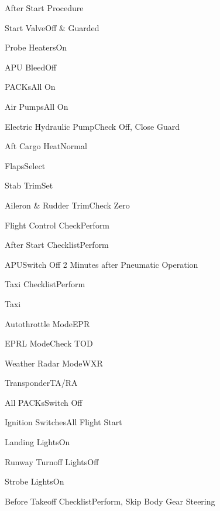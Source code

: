\documentclass[sim-use, blue_items]{checklist}
\begin{document}
\begin{checklist}{After Start Procedure}
	\item{Start Valve}{Off \& Guarded}
	\item{Probe Heaters}{On}
	\item{APU Bleed}{Off}
	\item{PACKs}{All On}
	\item{Air Pumps}{All On}
	\item{Electric Hydraulic Pump}{Check Off, Close Guard}
	\item{Aft Cargo Heat}{Normal}
	\item{Flaps}{Select}
	\item{Stab Trim}{Set}
	\item{Aileron \& Rudder Trim}{Check Zero}
	\item{Flight Control Check}{Perform}
	\item{After Start Checklist}{Perform}
	\item{APU}{Switch Off 2 Minutes after Pneumatic Operation}
	\item{Taxi Checklist}{Perform}
\end{checklist}

\begin{checklist}{Taxi}
	 {
		\item{Autothrottle Mode}{EPR}
		\item{EPRL Mode}{Check TOD}
		\item{Weather Radar Mode}{WXR}
		\item{Transponder}{TA/RA}
	}
	 {
		\item{All PACKs}{Switch Off}
		\item{Ignition Switches}{All Flight Start}
		\item{Landing Lights}{On}
		\item{Runway Turnoff Lights}{Off}
		\item{Strobe Lights}{On}
		\item{Before Takeoff Checklist}{Perform, Skip Body Gear Steering}
	}
\end{checklist}
\end{document}
